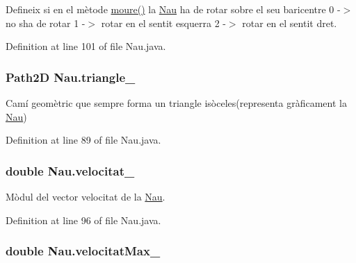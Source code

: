 Defineix si en el mètode \hyperlink{class_nau_a8dc46f91e02910b92bfad9b798f6552c}{moure()} la \hyperlink{class_nau}{Nau} ha de rotar sobre el seu baricentre 0 -\/$>$ no s\textquotesingle{}ha de rotar 1 -\/$>$ rotar en el sentit esquerra 2 -\/$>$ rotar en el sentit dret. 



Definition at line 101 of file Nau.\+java.

\hypertarget{class_nau_ad397487e3dc0062cc71fdfc4c562e347}{}
\subsubsection[{triangle\+\_\+}]{\setlength{\rightskip}{0pt plus 5cm}Path2\+D Nau.\+triangle\+\_\+\hspace{0.3cm}{\ttfamily [protected]}}\label{class_nau_ad397487e3dc0062cc71fdfc4c562e347}


Camí geomètric que sempre forma un triangle isòceles(representa gràficament la \hyperlink{class_nau}{Nau}) 



Definition at line 89 of file Nau.\+java.

\hypertarget{class_nau_ac1151817b8deaed7c77ceba3141b86e5}{}
\subsubsection[{velocitat\+\_\+}]{\setlength{\rightskip}{0pt plus 5cm}double Nau.\+velocitat\+\_\+\hspace{0.3cm}{\ttfamily [protected]}}\label{class_nau_ac1151817b8deaed7c77ceba3141b86e5}


Mòdul del vector velocitat de la \hyperlink{class_nau}{Nau}. 



Definition at line 96 of file Nau.\+java.

\hypertarget{class_nau_a6a18449674ed5d2317a6795bd56f7dd0}{}
\subsubsection[{velocitat\+Max\+\_\+}]{\setlength{\rightskip}{0pt plus 5cm}double Nau.\+velocitat\+Max\+\_\+\hspace{0.3cm}{\ttfamily [private]}}\label{class_nau_a6a18449674ed5d2317a6795bd56f7dd0}


